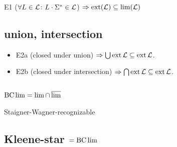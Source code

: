 E1 ($\forall L \in \mathcal{L} \colon L \cdot \Sigma^* \in \mathcal{L}$)
$\Rightarrow \operatorname{ext}(\mathcal{L}) \subseteq \lim(\mathcal{L})$

\subsection{union, intersection}
\begin{itemize}
\item
E2a (closed under union) $\Rightarrow \bigcup \operatorname{ext} \mathcal{L} \subseteq \operatorname{ext} \mathcal{L}$.
\item
E2b (closed under intersection) $\Rightarrow \bigcap \operatorname{ext} \mathcal{L} \subseteq \operatorname{ext} \mathcal{L}$.
\end{itemize}

\subsection{$\operatorname{BC} \lim = \lim \cap \operatorname{\overline{lim}}$}
\label{gen:staigner-wagner}
Staigner-Wagner-recognizable

\subsection{Kleene-star $= \operatorname{BC} \lim$}
\label{gen:kleene-star}

